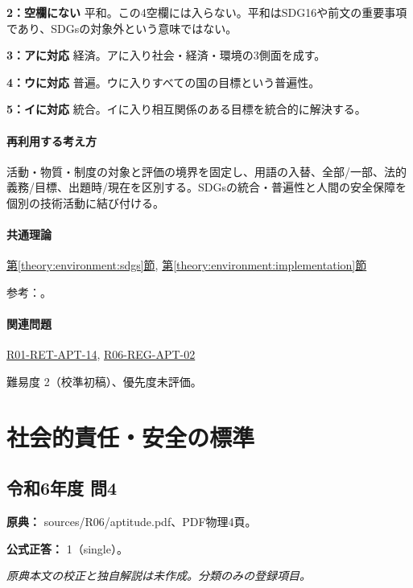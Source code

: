 \noindent\textbf{2：空欄にない} 平和。この4空欄には入らない。平和はSDG16や前文の重要事項であり、SDGsの対象外という意味ではない。\par

\noindent\textbf{3：アに対応} 経済。アに入り社会・経済・環境の3側面を成す。\par

\noindent\textbf{4：ウに対応} 普遍。ウに入りすべての国の目標という普遍性。\par

\noindent\textbf{5：イに対応} 統合。イに入り相互関係のある目標を統合的に解決する。\par

\paragraph{再利用する考え方} 活動・物質・制度の対象と評価の境界を固定し、用語の入替、全部/一部、法的義務/目標、出題時/現在を区別する。SDGsの統合・普遍性と人間の安全保障を個別の技術活動に結び付ける。

\paragraph{共通理論} \hyperref[theory:environment:sdgs]{第\ref*{theory:environment:sdgs}節}, \hyperref[theory:environment:implementation]{第\ref*{theory:environment:implementation}節}

\par 参考：\cite{env_sdgs_pamphlet,env_humansecurity}。

\paragraph{関連問題} \hyperref[q:r01-ret-apt-14]{R01-RET-APT-14}, \hyperref[q:r06-reg-apt-02]{R06-REG-APT-02}

\par 難易度 2（校準初稿）、優先度未評価。

\section{社会的責任・安全の標準}

\subsection{令和6年度 問4}
\label{q:r06-reg-apt-04}

\noindent\textbf{原典：} sources/R06/aptitude.pdf、PDF物理4頁。

\textbf{公式正答：} 1（single）。

\par\textit{原典本文の校正と独自解説は未作成。分類のみの登録項目。}
